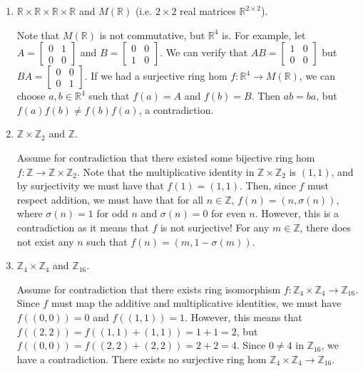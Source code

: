 \documentclass[12pt]{article}
\begin{document}
\begin{enumerate}
\item[b.] {
    $\mathbb R \times \mathbb R \times \mathbb R \times \mathbb R$ and $M(\mathbb R)$ (i.e. $2 \times 2$ real matrices $\mathbb R^{2\times 2}$). 

    Note that $M(\mathbb R)$ is not commutative, but $\mathbb R^4$ is. For example, let $A = \begin{bmatrix} 0 & 1 \\ 0 & 0 \end{bmatrix}$ and $B = \begin{bmatrix} 0 & 0 \\ 1 & 0 \end{bmatrix}$. We can verify that $AB = \begin{bmatrix} 1 & 0 \\ 0 & 0 \end{bmatrix}$ but $BA = \begin{bmatrix}0 & 0 \\ 0 & 1\end{bmatrix}$. If we had a surjective ring hom $f : \mathbb R^4 \to M(\mathbb R)$, we can choose $a, b \in \mathbb R^4$ such that $f(a) = A$ and $f(b) = B$. Then $ab = ba$, but $f(a)f(b) \neq f(b)f(a)$, a contradiction.
}
\item[e.] {
    $\mathbb Z \times \mathbb Z_2$ and $\mathbb Z$.

    Assume for contradiction that there existed some bijective ring hom $f : \mathbb Z \to \mathbb Z \times \mathbb Z_2$. Note that the multiplicative identity in $\mathbb Z \times \mathbb Z_2$ is $(1, 1)$, and by surjectivity we must have that $f(1) = (1,1)$. Then, since $f$ must respect addition, we must have that for all $n \in \mathbb Z$, $f(n) = (n, \sigma(n))$, where $\sigma(n) = 1$ for odd $n$ and $\sigma(n) = 0$ for even $n$. However, this is a contradiction as it means that $f$ is not surjective! For any $m \in \mathbb Z$, there does not exist any $n$ such that $f(n) = (m, 1- \sigma(m))$.
}
\item[f.] {
    $\mathbb Z_4 \times \mathbb Z_4$ and $\mathbb Z_{16}$. 
    
    Assume for contradiction that there exists ring isomorphism $f : \mathbb Z_4 \times \mathbb Z_4 \to \mathbb Z_{16}$. Since $f$ must map the additive and multiplicative identities, we must have $f((0, 0)) = 0$ and $f((1, 1)) = 1$. However, this means that $f((2, 2)) = f((1, 1) + (1, 1)) = 1 + 1 = 2$, but $f((0, 0)) = f((2, 2) + (2, 2)) = 2 + 2 = 4$. Since $0 \neq 4$ in $\mathbb Z_{16}$, we have a contradiction. There exists no surjective ring hom $\mathbb Z_4 \times \mathbb Z_4 \to \mathbb Z_{16}$.
}
\end{enumerate}
\end{document}
